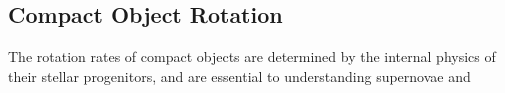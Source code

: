 {\color{orange}

\subsection{Compact Object Rotation}

The rotation rates of compact objects are determined by the internal physics of their stellar progenitors, and are essential to understanding supernovae and 

}